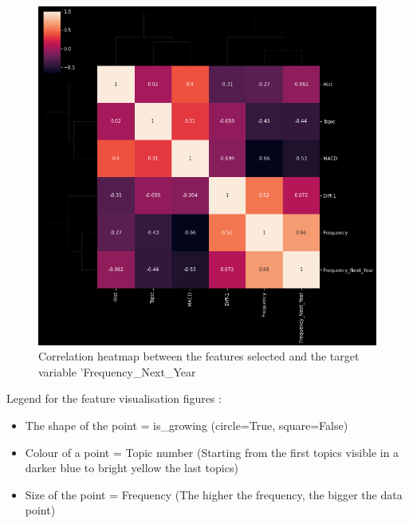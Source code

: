 \documentclass[12pt,MSc,a4paper,oneside]{muthesis}
\begin{document}
    \begin{figure}[h]
      \centering
      \includegraphics[scale=0.5]{test_corelatie.png}
      \caption{Correlation heatmap between the features selected and the target variable 'Frequency\_Next\_Year}
    \end{figure}

    \newpage

    Legend for the feature visualisation figures :
    \begin{itemize}
      \item The shape of the point = is\_growing (circle=True, square=False)
      \item Colour of a point = Topic number (Starting from the first topics visible in a darker blue to bright yellow the last topics)
      \item Size of the point = Frequency (The higher the frequency, the bigger the data point)
    \end{itemize}
\end{document}
